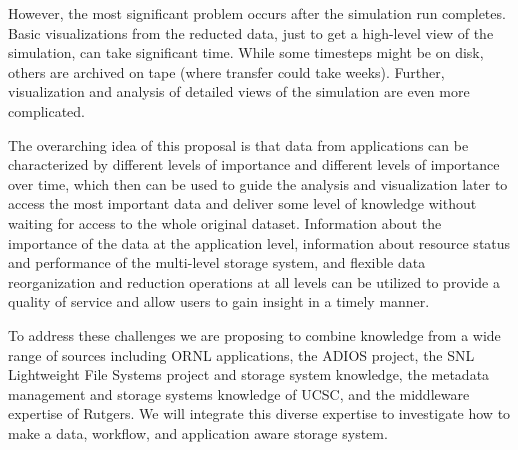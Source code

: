However, the most significant problem occurs after the simulation run completes. Basic visualizations from the reducted data, just to get a high-level view of the simulation, can take significant time. While some timesteps might be on disk, others are archived on tape (where transfer could take weeks). Further, visualization and analysis of detailed views of the simulation are even more complicated.

The overarching idea of this proposal is that data from applications can be characterized by different
levels of importance and different levels of importance over time, which then can be used to guide the analysis and visualization later to access the most important data and deliver some level of knowledge without waiting for access to the whole original dataset. Information about the importance of the data at the application level, information about resource status and performance of the multi-level storage system, and flexible data reorganization and reduction operations at all levels can be utilized to provide a quality of service and allow users to gain insight in a timely manner.


To address these challenges we are proposing to combine knowledge
from a wide range of sources including ORNL applications, the ADIOS project,
the SNL Lightweight File Systems project and storage system knowledge, the metadata
management and storage systems knowledge of UCSC, and the middleware expertise
of Rutgers. We will integrate this diverse expertise to investigate how to make
a data, workflow, and application aware storage system.

